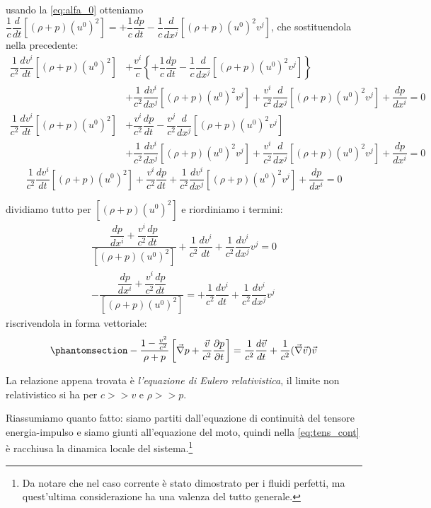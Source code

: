 usando la \eqref{eq:alfa_0} otteniamo $ \dfrac{1}{c}\dfrac{d}{dt}[(\rho+p)(u^0)^2]=+\dfrac{1}{c}\dfrac{dp}{dt}- \dfrac{1}{c}\dfrac{d}{dx^j}[(\rho+p)(u^0)^2 v^j]$, che sostituendola nella precedente:
\begin{equation*}
\begin{aligned}
    \dfrac{1}{c^2}\dfrac{dv^i}{dt}[(\rho+p)(u^0)^2]&+\dfrac{v^i}{c}\left\{+\dfrac{1}{c}\dfrac{dp}{dt}- \dfrac{1}{c}\dfrac{d}{dx^j}[(\rho+p)(u^0)^2 v^j]\right\}\\
    &+\dfrac{1}{c^2}\dfrac{dv^i}{dx^j}[(\rho+p)(u^0)^2v^j]+\dfrac{v^i}{c^2}\dfrac{d}{dx^j}[(\rho+p)(u^0)^2v^j]+\dfrac{dp}{dx^i}=0
\end{aligned}
\end{equation*}
\begin{equation}
\begin{aligned}
        \dfrac{1}{c^2}\dfrac{dv^i}{dt}[(\rho+p)(u^0)^2]&+\dfrac{v^i}{c^2}\dfrac{dp}{dt}-\dfrac{v^j}{c^2} \dfrac{d}{dx^j}[(\rho+p)(u^0)^2 v^j]\\
    &+\dfrac{1}{c^2}\dfrac{dv^i}{dx^j}[(\rho+p)(u^0)^2v^j]+\dfrac{v^i}{c^2}\dfrac{d}{dx^j}[(\rho+p)(u^0)^2v^j]+\dfrac{dp}{dx^i}=0
\end{aligned}
\end{equation}
\begin{equation*}
        \dfrac{1}{c^2}\dfrac{dv^i}{dt}[(\rho+p)(u^0)^2]+\dfrac{v^i}{c^2}\dfrac{dp}{dt}+\dfrac{1}{c^2}\dfrac{dv^i}{dx^j}[(\rho+p)(u^0)^2v^j]+\dfrac{dp}{dx^i}=0
\end{equation*}

dividiamo tutto per $[(\rho+p)(u^0)^2]$ e riordiniamo i termini:
\begin{equation}
\begin{gathered}
     \dfrac{\dfrac{dp}{dx^i}+\dfrac{v^i}{c^2}\dfrac{dp}{dt}}{[(\rho+p)(u^0)^2]} + \dfrac{1}{c^2}\dfrac{dv^i}{dt}+\dfrac{1}{c^2}\dfrac{dv^i}{dx^j}v^j=0\\
    -  \dfrac{\dfrac{dp}{dx^i}+\dfrac{v^i}{c^2}\dfrac{dp}{dt}}{[(\rho+p)(u^0)^2]}= + \dfrac{1}{c^2}\dfrac{dv^i}{dt}+\dfrac{1}{c^2}\dfrac{dv^i}{dx^j}v^j
\end{gathered}
\end{equation}
riscrivendola in forma vettoriale:
\begin{equation}\phantomsection\label{eq:euler_rel}
     -\dfrac{1-\frac{v^2}{c^2}}{\rho+p} \left[\Vec{\nabla}p+\dfrac{\Vec{v}}{c^2}\dfrac{\partial p}{\partial t}\right] =\dfrac{1}{c^2}\dfrac{d\Vec{v}}{dt}+\dfrac{1}{c^2}(\Vec{\nabla}\Vec{v})\Vec{v}
\end{equation}

La relazione appena trovata è \textit{l'equazione di Eulero relativistica}, il limite non relativistico si ha per $c>>v$ e $\rho>>p$.

Riassumiamo quanto fatto: siamo partiti dall'equazione di continuità del tensore energia-impulso e siamo giunti all'equazione del moto, quindi nella \eqref{eq:tens_cont} è racchiusa la dinamica locale del sistema.\footnote{Da notare che nel caso corrente è stato dimostrato per i fluidi perfetti, ma quest'ultima considerazione ha una valenza del tutto generale.}